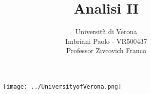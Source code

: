 


\title{Analisi II}
\author{Università di Verona\\Imbriani Paolo - VR500437\\Professor Zivcovich Franco}


\begin{figure}
    \centering
    \texttt{[image: ../UniversityofVerona.png]}
\end{figure}

\maketitle 

\pagebreak

\tableofcontents

\pagebreak

